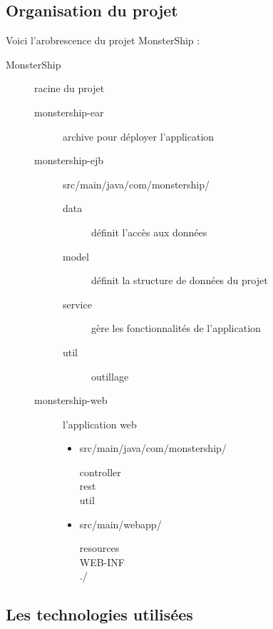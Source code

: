 \documentclass[a4paper,11pt]{report}
\begin{document}
    \subsection{Organisation du projet}
      Voici l'arobrescence du projet MonsterShip :
      \begin{description}
        \item[MonsterShip] racine du projet
        \begin{description}
          \item[monstership-ear] archive pour déployer l'application
          \item[monstership-ejb] src/main/java/com/monstership/
          \begin{description}
            \item[data] définit l'accès aux données
            \item[model] définit la structure de données du projet
            \item[service] gère les fonctionnalités de l'application 
            \item[util] outillage
          \end{description}
          \item[monstership-web] l'application web
          \begin{itemize}
            \item src/main/java/com/monstership/
            \begin{description}
              \item[controller]
              \item[rest]
              \item[util] 
            \end{description}
            \item src/main/webapp/
            \begin{description}
              \item[resources] 
              \item[WEB-INF]
              \item[./] 
            \end{description}
          \end{itemize}
          
          
        \end{description}
      \end{description}

    \subsection{Les technologies utilisées}
\end{document}
